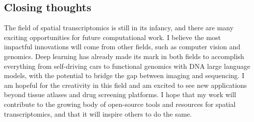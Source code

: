 \begin{dissertationepilogue}
    \section{Closing thoughts}

    The field of spatial transcriptomics is still in its infancy, and there are many exciting opportunities for future computational work. I believe the most impactful innovations will come from other fields, such as computer vision and genomics. Deep learning has already made its mark in both fields to accomplish everything from self-driving cars to functional genomics with DNA large language models, with the potential to bridge the gap between imaging and sequencing. I am hopeful for the creativity in this field and am excited to see new applications beyond tissue atlases and drug screening platforms. I hope that my work will contribute to the growing body of open-source tools and resources for spatial transcriptomics, and that it will inspire others to do the same.

\end{dissertationepilogue}